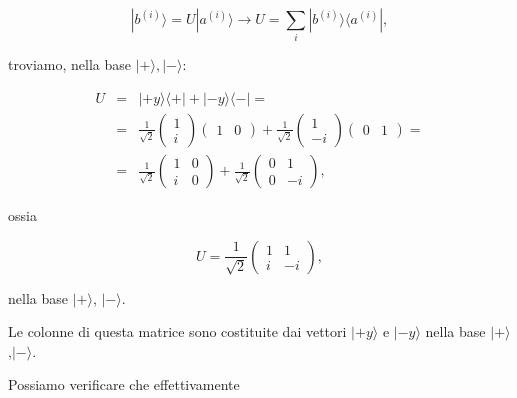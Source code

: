 \begin{equation}
| b^{(i)}\rangle =U| a^{(i)} \rangle \rightarrow U = \sum \limits_i | b^{(i)}\rangle \langle a^{(i)}| ,
\end{equation}

troviamo, nella base $| + \rangle,| - \rangle$:

\begin{eqnarray}
U &=& | +y \rangle \langle + | + |-y \rangle \langle - |=\nonumber \\
&=&\frac{1}{\sqrt{2}}
\begin{pmatrix}
1\\
i
\end{pmatrix}
\begin{pmatrix}
1 & 0
\end{pmatrix}+
\frac{1}{\sqrt{2}}
\begin{pmatrix}
1\\
-i
\end{pmatrix}
\begin{pmatrix}
0 & 1
\end{pmatrix}= \nonumber \\
&=&\frac{1}{\sqrt{2}}
\begin{pmatrix}
1 & 0\\
i & 0
\end{pmatrix}+
\frac{1}{\sqrt{2}}
\begin{pmatrix}
0 & 1\\
0 & -i
\end{pmatrix} ,
\end{eqnarray}

ossia

\begin{equation}
U= \frac{1}{\sqrt{2}}
\begin{pmatrix}
1 & 1\\
i & -i
\end{pmatrix} ,
\end{equation}

nella base $| + \rangle $, $| - \rangle $.

Le colonne di questa matrice sono costituite dai vettori $| +y \rangle $ e $| -y \rangle $ nella base $| + \rangle $,$| - \rangle $.

Possiamo verificare che effettivamente

